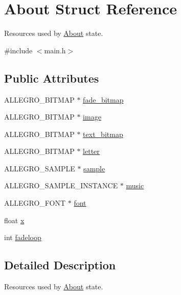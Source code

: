 \hypertarget{structAbout}{\section{About Struct Reference}
\label{structAbout}
}


Resources used by \hyperlink{structAbout}{About} state.  




{\ttfamily \#include $<$main.\-h$>$}

\subsection*{Public Attributes}
\begin{DoxyCompactItemize}
\item 
A\-L\-L\-E\-G\-R\-O\-\_\-\-B\-I\-T\-M\-A\-P $\ast$ \hyperlink{structAbout_a0c80b08e1d60093504bed342b41e51c1}{fade\-\_\-bitmap}
\item 
A\-L\-L\-E\-G\-R\-O\-\_\-\-B\-I\-T\-M\-A\-P $\ast$ \hyperlink{structAbout_a9e724aa84d322d2bfff5c00109492a1d}{image}
\item 
A\-L\-L\-E\-G\-R\-O\-\_\-\-B\-I\-T\-M\-A\-P $\ast$ \hyperlink{structAbout_a2e5dbd59393791949fd988de7b770f86}{text\-\_\-bitmap}
\item 
A\-L\-L\-E\-G\-R\-O\-\_\-\-B\-I\-T\-M\-A\-P $\ast$ \hyperlink{structAbout_aa46380e60629ac39d782e18dc6a08f8e}{letter}
\item 
A\-L\-L\-E\-G\-R\-O\-\_\-\-S\-A\-M\-P\-L\-E $\ast$ \hyperlink{structAbout_aaae3fb8b349d9973fde2156e1f86c75b}{sample}
\item 
A\-L\-L\-E\-G\-R\-O\-\_\-\-S\-A\-M\-P\-L\-E\-\_\-\-I\-N\-S\-T\-A\-N\-C\-E $\ast$ \hyperlink{structAbout_a4c25f6cd85f909dca5325b8825eed16c}{music}
\item 
A\-L\-L\-E\-G\-R\-O\-\_\-\-F\-O\-N\-T $\ast$ \hyperlink{structAbout_ad14358b4942c0260e502a65b98732f93}{font}
\item 
float \hyperlink{structAbout_a8ff1ed42ee1abd6ad45def77614015ce}{x}
\item 
int \hyperlink{structAbout_a3a7b7ae29163ae843671a2c2b5e8c1f0}{fadeloop}
\end{DoxyCompactItemize}


\subsection{Detailed Description}
Resources used by \hyperlink{structAbout}{About} state. 

